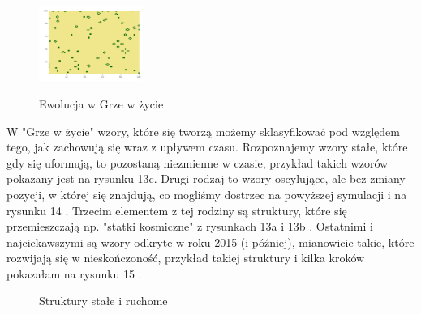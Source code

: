 \documentclass[a4paper,12pt]{article}
\begin{document}
\begin{figure}[!htb]
{\includegraphics[width=0.3\textwidth]{tab_m_g_t426.png}}
\quad
{}
\caption{Ewolucja w Grze w życie}
\label{fig:animals}
\end{figure}

W "Grze w życie" wzory, które się tworzą możemy sklasyfikować pod względem tego, jak zachowują się wraz z upływem czasu. Rozpoznajemy wzory stałe, które gdy się uformują, to pozostaną niezmienne w czasie, przykład takich wzorów pokazany jest na rysunku 13c. Drugi rodzaj to wzory oscylujące, ale bez zmiany pozycji, w której się znajdują, co mogliśmy dostrzec na  powyższej symulacji i na rysunku 14 \cite{o}. Trzecim elementem z tej rodziny są struktury, które się przemieszczają np. "statki kosmiczne" z rysunkach 13a i 13b \cite{st}.
Ostatnimi i najciekawszymi są wzory odkryte w roku 2015 (i później), mianowicie takie, które rozwijają się w nieskończoność, przykład takiej struktury i kilka kroków pokazałam na rysunku 15 \cite{2015}.
\begin{figure}
\centering
{}
\quad
{}
\quad
{}
\caption{Struktury stałe i ruchome}
\label{fig:animals}
\end{figure}
\end{document}
